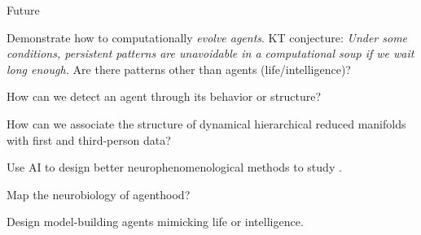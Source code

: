 \begin{frame}[label=ladila]{Future}
 

Demonstrate how to computationally \textit{evolve agents}. KT conjecture: \textit{\textit{Under some conditions, persistent patterns} are unavoidable  in a computational soup if we wait long enough.} Are there patterns other than agents  (life/intelligence)? \vfill

How can we detect an agent through its behavior or structure? \vfill


How can we associate the structure of dynamical hierarchical reduced manifolds\cite{ruffini_algorithmic_2024} with first and third-person data?\vfill

Use AI to design better neurophenomenological methods to study \SEP.   \vfill

Map the neurobiology of agenthood\cite{ruffini_algorithmic_2024}?\vfill

Design model-building agents mimicking life or intelligence. 
 
\end{frame}


